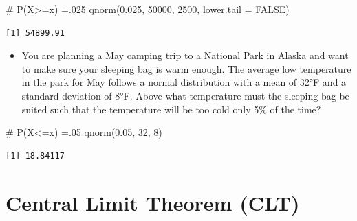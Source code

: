 \documentclass[
  letterpaper,
  DIV=11,
  numbers=noendperiod]{scrreprt}
\newenvironment{Shaded}{\begin{snugshade}}{\end{snugshade}}
\newcommand{\AttributeTok}[1]{\textcolor[rgb]{0.40,0.45,0.13}{#1}}
\newcommand{\CommentTok}[1]{\textcolor[rgb]{0.37,0.37,0.37}{#1}}
\newcommand{\ConstantTok}[1]{\textcolor[rgb]{0.56,0.35,0.01}{#1}}
\newcommand{\DecValTok}[1]{\textcolor[rgb]{0.68,0.00,0.00}{#1}}
\newcommand{\FloatTok}[1]{\textcolor[rgb]{0.68,0.00,0.00}{#1}}
\newcommand{\FunctionTok}[1]{\textcolor[rgb]{0.28,0.35,0.67}{#1}}
\newcommand{\NormalTok}[1]{\textcolor[rgb]{0.00,0.23,0.31}{#1}}
\providecommand{\tightlist}{%
  \setlength{\itemsep}{0pt}\setlength{\parskip}{0pt}}\usepackage{longtable,booktabs,array}
\begin{document}
\begin{Shaded}
\begin{Highlighting}[]
\CommentTok{\# P(X\textgreater{}=x) =.025}
\FunctionTok{qnorm}\NormalTok{(}\FloatTok{0.025}\NormalTok{, }\DecValTok{50000}\NormalTok{, }\DecValTok{2500}\NormalTok{, }\AttributeTok{lower.tail =} \ConstantTok{FALSE}\NormalTok{)}
\end{Highlighting}
\end{Shaded}

\begin{verbatim}
[1] 54899.91
\end{verbatim}

\begin{itemize}
\tightlist
\item
  You are planning a May camping trip to a National Park in Alaska and
  want to make sure your sleeping bag is warm enough. The average low
  temperature in the park for May follows a normal distribution with a
  mean of 32°F and a standard deviation of 8°F. Above what temperature
  must the sleeping bag be suited such that the temperature will be too
  cold only 5\% of the time?
\end{itemize}

\begin{Shaded}
\begin{Highlighting}[]
\CommentTok{\# P(X\textless{}=x) =.05}
\FunctionTok{qnorm}\NormalTok{(}\FloatTok{0.05}\NormalTok{, }\DecValTok{32}\NormalTok{, }\DecValTok{8}\NormalTok{)}
\end{Highlighting}
\end{Shaded}

\begin{verbatim}
[1] 18.84117
\end{verbatim}


\chapter{Central Limit Theorem (CLT)}\label{central-limit-theorem-clt}
\end{document}
